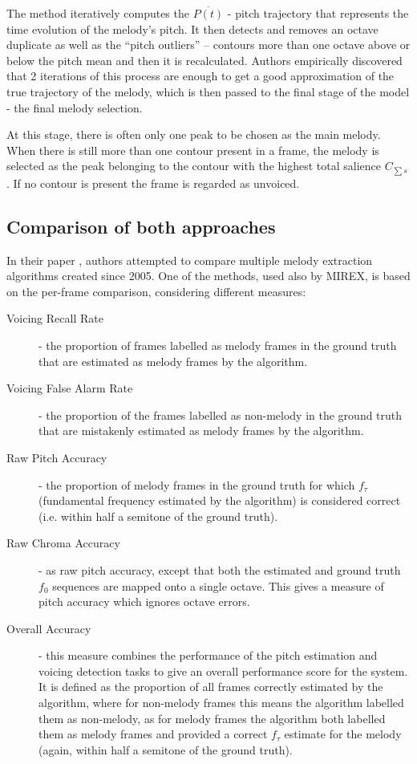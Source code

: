 The method iteratively computes the $\overline{P(t)}$ - pitch trajectory that represents the time evolution of the melody's pitch. It then detects and removes an octave duplicate as well as  the ``pitch outliers'' – contours more than one octave above or below the pitch mean and then it is recalculated. Authors empirically discovered that 2 iterations of this process are enough to get a good approximation of the true trajectory of the melody, which is then passed to the final stage of the model - the final melody selection.

At this stage, there is often only one peak to be chosen as the main melody. When there is still more than one contour present in a frame, the melody is selected as the peak belonging to the contour with the highest total salience $C_{\sum s}$. If no contour is present the frame is regarded as unvoiced.

\vspace{10pt}

\subsection{Comparison of both approaches}

In their paper \cite{comparison}, authors attempted to compare multiple melody extraction algorithms created since 2005. One of the methods, used also by MIREX, is based on the per-frame comparison, considering different measures:

\begin{description}
\item[Voicing Recall Rate] - the proportion of frames labelled as melody frames in the ground truth that are estimated as melody frames by the algorithm.
\item[Voicing False Alarm Rate] - the proportion of the frames labelled as non-melody in the ground truth that are mistakenly estimated as melody frames by the algorithm.
\item[Raw Pitch Accuracy] - the proportion of melody frames in the ground truth for which $f_{\tau}$ (fundamental frequency estimated by the algorithm) is considered correct (i.e. within half a semitone of the ground truth). 
\item[Raw Chroma Accuracy] - as raw pitch accuracy, except that both the estimated and ground truth $f_{0}$ sequences are mapped onto a single octave. This gives a measure of pitch accuracy which ignores octave errors.
\item[Overall Accuracy] - this measure combines the performance of the pitch estimation and voicing detection tasks to give an overall performance score for the system. It is defined as the proportion of all frames correctly estimated by the algorithm, where for non-melody frames this means the algorithm labelled them as non-melody, as for melody frames the algorithm both labelled them as melody frames and provided a correct $f_{\tau}$ estimate for the melody (again, within half a semitone of the ground truth).
\end{description}


